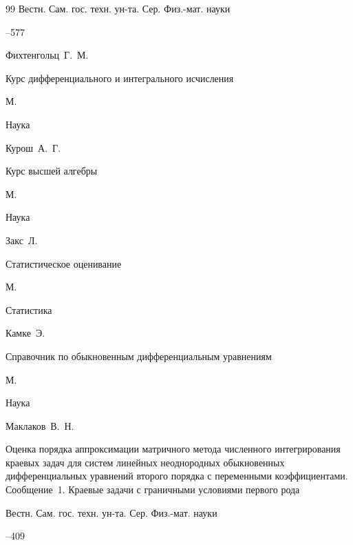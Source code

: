 \begin{thebibliography}{99}
\jour Вестн. Сам. гос. техн. ун-та. Сер. Физ.-мат. науки




--577







\by Фихтенгольц~Г.~М.

\book Курс дифференциального и интегрального исчисления


\publaddr  М.

\publ Наука






\by Курош~А.~Г.

\book Курс высшей алгебры

\publaddr  М.

\publ Наука






\by Закс~Л.

\book Статистическое оценивание

\publaddr  М.

\publ Статистика






\by Камке~Э.

\book Справочник по обыкновенным дифференциальным уравнениям

\publaddr  М.

\publ Наука






\by Маклаков~В.~Н.

\paper Оценка порядка аппроксимации матричного метода численного интегрирования краевых задач для систем линейных неоднородных обыкновенных дифференциальных уравнений второго порядка с переменными коэффициентами. Сообщение~1. Краевые задачи с граничными условиями первого рода

\jour Вестн. Сам. гос. техн. ун-та. Сер. Физ.-мат. науки




--409






\end{thebibliography}
